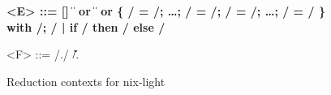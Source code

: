\begin{figure}
  \begin{grammar}
    \bfseries
    <E> ::= [] \| 
    \alt {} \|  or  \|  \|  or 
    \alt \{ \x/ = \e/; \ldots{}; \x/ = \e/; \E/ = \e/; \ldots{}; \e/ = \e/ \}
    \alt with \E/; \e/ | if \E/ then \e/ else \e/

    <F> ::= \E/.\a/ \| \v/.
  \end{grammar}
  \caption{Reduction contexts for nix-light\label{fig:semantics:nix-light:reduction-contexts}}
\end{figure}
